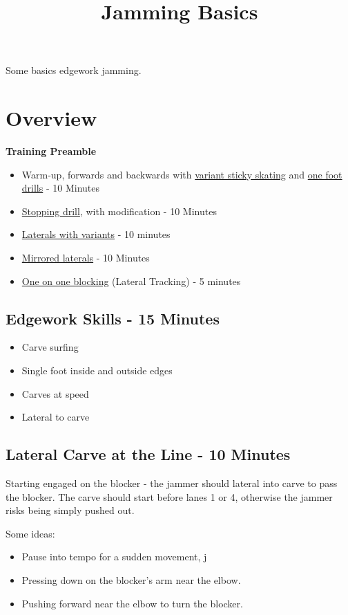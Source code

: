 \documentclass{journal}
\title{Jamming Basics}
\author{}
\begin{document}
\maketitle
\noindent 

Some basics edgework jamming.

\section*{Overview}

{\bf Training Preamble}
\begin{itemize}
\item Warm-up, forwards and backwards with \hyperref[drill:sticky:sticky_one_foot]{variant sticky skating} and \hyperref[drill:one_foot:serpentine]{one foot drills} - 10 Minutes
\item \hyperref[drill:stopping:jackie_daniels]{Stopping drill}, with modification - 10 Minutes 
\item \hyperref[drill:laterals]{Laterals with variants} - 10 minutes 
\item \hyperref[drill:laterals:mirrored]{Mirrored laterals} - 10 Minutes 
\item \hyperref[drill:blocking:one_on_one]{One on one blocking} (Lateral Tracking) - 5 minutes
\end{itemize}


\subsection*{Edgework Skills - 15 Minutes}
\begin{itemize}
    \item Carve surfing 
    \item Single foot inside and outside edges 
    \item Carves at speed 
    \item Lateral to carve
\end{itemize}

\subsection*{Lateral Carve at the Line - 10 Minutes}

Starting engaged on the blocker - the jammer should lateral into carve to pass the blocker.
The carve should start before lanes 1 or 4, otherwise the jammer risks being simply pushed out.

Some ideas:
\begin{itemize}
    \item Pause into tempo for a sudden movement, j
    \item Pressing down on the blocker's arm near the elbow.
    \item Pushing forward near the elbow to turn the blocker.
\end{itemize}  
\end{document}
